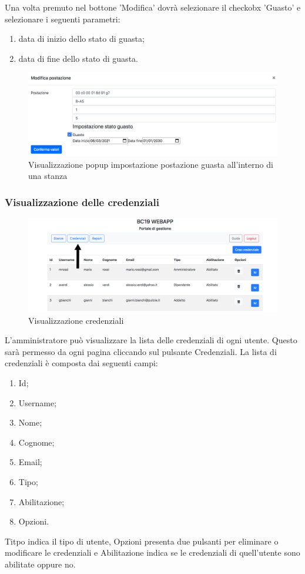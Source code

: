 Una volta premuto nel bottone 'Modifica' dovrà selezionare il checkobx 'Guasto' e selezionare i seguenti parametri:
\begin{enumerate}
	\item data di inizio dello stato di guasta;
	\item data di fine dello stato di guasta.
\end{enumerate}
\begin{figure}[H]
	\centering
	\includegraphics[width=15cm]{res/images/postazioneGuasta.png}
	\caption{Visualizzazione popup impostazione postazione guasta all'interno di una stanza}
\end{figure}

\subsubsection{Visualizzazione delle credenziali}
\begin{figure}[H]
	\centering
	\includegraphics[width=15cm]{res/images/credential.png}
	\caption{Visualizzazione credenziali}
\end{figure}
L’amministratore può visualizzare la lista delle credenziali di ogni utente. Questo sarà permesso da ogni pagina cliccando sul pulsante Credenziali.
La lista di credenziali è composta dai seguenti campi:
\begin{enumerate}
	\item Id;
	\item Username;
	\item Nome;
	\item Cognome;
	\item Email;
	\item Tipo;
	\item Abilitazione;
	\item Opzioni.
\end{enumerate}
Titpo indica il tipo di utente, Opzioni presenta due pulsanti per eliminare o modificare le credenziali e Abilitazione indica se le credenziali di quell'utente sono abilitate oppure no.

